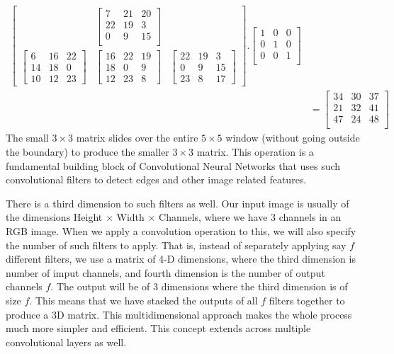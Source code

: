 \documentclass[../../deep_learning_notes.tex]{subfiles}
\begin{document}
\begin{align*}
\begin{bmatrix}
        &\begin{bmatrix}
            7 &21 &20\\
            22 &19  &3\\
            0 &9  &15\\
        \end{bmatrix}\\
        \begin{bmatrix}
            6  &16 &22\\
            14  &18 &0\\
            10  &12 &23
        \end{bmatrix}
        &\begin{bmatrix}
            16 &22 &19\\
            18 &0 &9\\
            12 &23 &8
        \end{bmatrix}
        &\begin{bmatrix}
            22 &19  &3\\
            0 &9  &15\\
            23 &8  &17
        \end{bmatrix}
    \end{bmatrix}.
    \begin{bmatrix}
        1 &0 &0\\
        0 &1 &0\\
        0 &0 &1\\
    \end{bmatrix}\\ &=
    \begin{bmatrix}
        34 &30 &37\\
        21 &32 &41\\
        47 &24 &48\\
    \end{bmatrix}
\end{align*}
The small $3 \times 3$ matrix slides over the entire $5 \times 5$ window (without going outside the boundary) to produce the smaller $3 \times 3$ matrix. This operation is a fundamental building block of Convolutional Neural Networks that uses such convolutional filters to detect edges and other image related features.\newline

There is a third dimension to such filters as well. Our input image is usually of the dimensions Height $\times$ Width $\times$ Channels, where we have 3 channels in an RGB image. When we apply a convolution operation to this, we will also specify the number of such filters to apply. That is, instead of separately applying say $f$ different filters, we use a matrix of 4-D dimensions, where the third dimension is number of imput channels, and fourth dimension is the number of output channels $f$. The output will be of 3 dimensions where the third dimension is of size $f$. This means that we have stacked the outputs of all $f$ filters together to produce a 3D matrix. This multidimensional approach makes the whole process much more simpler and efficient. This concept extends across multiple convolutional layers as well.
\end{document}
